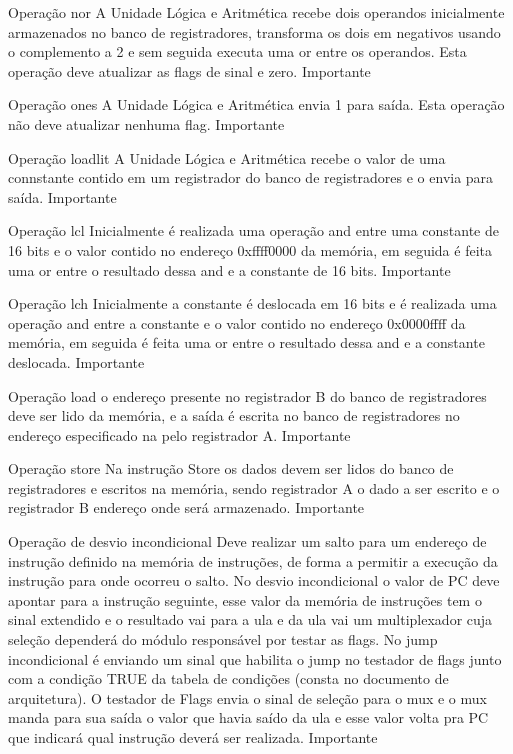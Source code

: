 \documentclass{report}
\begin{document}
\begin{functional}
      \requirement
      {Operação nor}
      {A Unidade Lógica e Aritmética recebe dois operandos inicialmente armazenados no banco de registradores, transforma os dois em negativos usando o complemento a 2 e sem seguida executa uma or entre os  operandos. Esta operação deve atualizar as flags de sinal e zero.}
      {Importante}
      
      \requirement
      {Operação ones}
      {A Unidade Lógica e Aritmética envia 1 para saída. Esta operação não deve atualizar nenhuma flag.}
      {Importante}
      
      \requirement
      {Operação loadlit}
      {A Unidade Lógica e Aritmética recebe o valor de uma connstante contido em um registrador do banco de registradores e o envia para saída.}
      {Importante}
      
       \requirement
      {Operação lcl}
      {Inicialmente é realizada uma operação and entre uma constante de 16 bits e o valor contido no endereço 0xffff0000 da memória, em seguida é feita uma or entre o resultado dessa and e a constante de 16 bits.}
      {Importante}
      
       \requirement
      {Operação lch}
      {Inicialmente a constante é deslocada em 16 bits e é realizada uma operação and entre a constante e o valor contido no endereço 0x0000ffff da memória, em seguida é feita uma or entre o resultado dessa and e a constante deslocada.}
      {Importante}
      
       \requirement
      {Operação load}
      {o endereço presente no registrador B do banco de registradores deve ser lido da memória, e a saída é escrita no banco de registradores no endereço especificado na pelo registrador A.}
      {Importante}
      
      \requirement
      {Operação store}
      {Na instrução Store os dados devem ser lidos do banco de registradores e escritos na memória, sendo registrador A o dado a ser escrito e o registrador B endereço onde será armazenado.}
      {Importante}
      
       \requirement
      {Operação de desvio incondicional}
      {Deve realizar um salto para um endereço de instrução definido na memória de instruções, de forma a permitir a execução da instrução para onde ocorreu o salto. No desvio incondicional o valor de PC deve apontar para a instrução seguinte, esse valor da memória de instruções tem o sinal extendido e o resultado vai para a ula e da ula vai um multiplexador cuja seleção dependerá do módulo responsável por testar as flags. No jump incondicional é enviando um sinal que habilita o jump no testador de flags junto com a condição TRUE da tabela de condições (consta no documento de arquitetura). O testador de Flags envia o sinal de seleção para o mux e o mux manda para sua saída o valor que havia saído da ula e esse valor volta pra PC que indicará qual instrução deverá ser realizada.}
      {Importante}
      

\end{functional}
\end{document}
